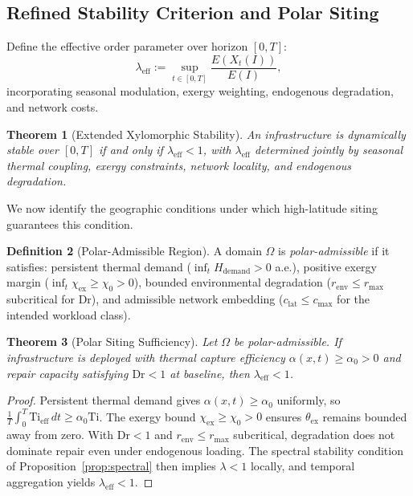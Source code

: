 \documentclass[10pt,twocolumn]{article}
\theoremstyle{plain}
\newtheorem{theorem}{Theorem}
\theoremstyle{definition}
\newtheorem{definition}[theorem]{Definition}
\theoremstyle{remark}
\begin{document}
\subsection{Refined Stability Criterion and Polar Siting}

Define the effective order parameter over horizon $[0,T]$:
\[
  \lambda_{\mathrm{eff}}
  := \sup_{t \in [0,T]}
  \frac{E(X_t(I))}{E(I)},
\]
incorporating seasonal modulation, exergy weighting, endogenous
degradation, and network costs.

\begin{theorem}[Extended Xylomorphic Stability]
\label{thm:extended}
An infrastructure is dynamically stable over $[0,T]$ if and only if
$\lambda_{\mathrm{eff}} < 1$, with $\lambda_{\mathrm{eff}}$ determined
jointly by seasonal thermal coupling, exergy constraints, network
locality, and endogenous degradation.
\end{theorem}

We now identify the geographic conditions under which high-latitude
siting guarantees this condition.

\begin{definition}[Polar-Admissible Region]
A domain $\Omega$ is \emph{polar-admissible} if it satisfies:
persistent thermal demand ($\inf_t H_{\mathrm{demand}} > 0$ a.e.),
positive exergy margin ($\inf_t \chi_{\mathrm{ex}} \geq \chi_0 > 0$),
bounded environmental degradation ($r_{\mathrm{env}} \leq r_{\max}$
subcritical for $\mathrm{Dr}$), and admissible network embedding
($c_{\mathrm{lat}} \leq c_{\max}$ for the intended workload class).
\end{definition}

\begin{theorem}[Polar Siting Sufficiency]
\label{thm:polar}
Let $\Omega$ be polar-admissible. If infrastructure is deployed with
thermal capture efficiency $\alpha(x,t) \geq \alpha_0 > 0$ and repair
capacity satisfying $\mathrm{Dr} < 1$ at baseline, then
$\lambda_{\mathrm{eff}} < 1$.
\end{theorem}

\begin{proof}
Persistent thermal demand gives $\alpha(x,t) \geq \alpha_0$ uniformly,
so $\frac{1}{T}\int_0^T \mathrm{Ti}_{\mathrm{eff}}\,dt \geq \alpha_0
\mathrm{Ti}$. The exergy bound $\chi_{\mathrm{ex}} \geq \chi_0 > 0$
ensures $\theta_{\mathrm{ex}}$ remains bounded away from zero. With
$\mathrm{Dr} < 1$ and $r_{\mathrm{env}} \leq r_{\max}$ subcritical,
degradation does not dominate repair even under endogenous loading.
The spectral stability condition of Proposition~\ref{prop:spectral}
then implies $\lambda < 1$ locally, and temporal aggregation yields
$\lambda_{\mathrm{eff}} < 1$.
\end{proof}
\end{document}
